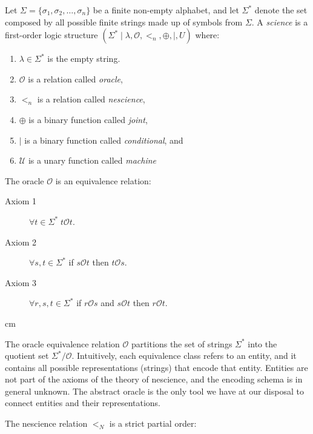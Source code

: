 Let $\Sigma = \{ \sigma_1, \sigma_2, \ldots, \sigma_n \}$ be a finite non-empty alphabet, and let $\Sigma^\ast$ denote the set composed by all possible finite strings made up of symbols from $\Sigma$. A \emph{science} is a first-order logic structure $(\Sigma^\ast \mid \lambda, \mathcal{O}, <_n, \oplus, \mid, U)$ where:

\vskip 0.25cm

\begin{enumerate}[label=(\roman*)]
\item $\lambda \in \Sigma^\ast$ is the empty string.
\item $\mathcal{O}$ is a relation called \emph{oracle},
\item $<_n$ is a relation called \emph{nescience},
\item $\oplus$ is a binary function called \emph{joint},
\item $\mid$ is a binary function called \emph{conditional}, and
\item $\mathcal{U}$ is a unary function called \emph{machine}
\end{enumerate}

\vskip 0.25cm

The oracle $\mathcal{O}$ is an equivalence relation:

\vskip 0.25cm

\begin{description}
\item[Axiom 1] $\forall t \in \Sigma^\ast \; t \mathcal{O} t$.
\item[Axiom 2] $\forall s , t \in \Sigma^\ast$ if $s \mathcal{O} t$ then $t \mathcal{O} s$.
\item[Axiom 3] $\forall r, s , t \in \Sigma^\ast$ if $r \mathcal{O} s$ and $s \mathcal{O} t$ then $r \mathcal{O} t$.
\end{description}

 cm

The oracle equivalence relation $\mathcal{O}$ partitions the set of strings $\Sigma^\ast$ into the quotient set $\Sigma^\ast / \mathcal{O}$. Intuitively, each equivalence class refers to an entity, and it contains all possible representations (strings) that encode that entity. Entities are not part of the axioms of the theory of nescience, and the encoding schema is in general unknown. The abstract oracle is the only tool we have at our disposal to connect entities and their representations.

The nescience relation $<_N$ is a strict partial order:

